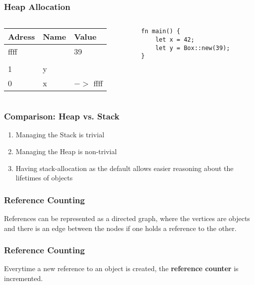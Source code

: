\documentclass{beamer}
\begin{document}
\begin{frame}[fragile]
	\frametitle{Heap Allocation}
	\begin{columns}[T, c]
		\begin{column}{0.48\textwidth}
			\begin{tabular}{| l | l | l |}
				\hline
				Adress & Name & Value  \\ \hline
				ffff & & 39 \\ \hline
				&   & \\ \hline
				1 & y & \\ \hline
				0 & x & $->$ ffff \\ \hline
			\end{tabular}
		\end{column}
		\begin{column}{0.48\textwidth}
			\begin{verbatim}
fn main() {
	let x = 42;
	let y = Box::new(39);
}
			\end{verbatim}
		\end{column}
	\end{columns}
\end{frame}
\begin{frame}
	\frametitle{Comparison: Heap vs. Stack}
	\begin{enumerate}
		\item Managing the Stack is trivial
		\item Managing the Heap is non-trivial
		\item Having stack-allocation as the default allows easier reasoning about the lifetimes of objects
	\end{enumerate}
\end{frame}
\begin{frame}
	\frametitle{Reference Counting}
	References can be represented as a directed graph, where the vertices are objects and there is an edge between the nodes if one holds a reference to the other.
	\begin{figure}
		\def\svgwidth{120pt}
		\LARGE
		
	\end{figure}
\end{frame}
\begin{frame}
	\frametitle{Reference Counting}
	Everytime a new reference to an object is created, the \textbf{reference counter} is incremented.
	\begin{figure}
		\def\svgwidth{120pt}
		\LARGE
		
	\end{figure}
\end{frame}
\end{document}

